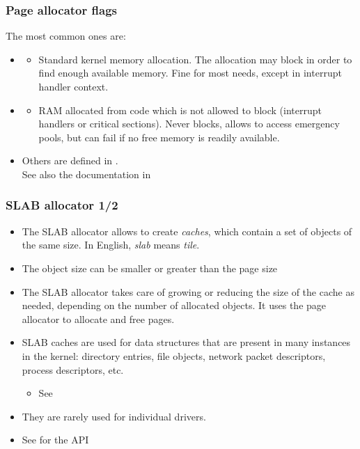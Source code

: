 \begin{frame}
  \frametitle{Page allocator flags}
  The most common ones are:
  \begin{itemize}
  \item {}
    \begin{itemize}
    \item Standard kernel memory allocation. The allocation may
      block in order to find enough available memory. Fine for most
      needs, except in interrupt handler context.
    \end{itemize}
  \item {}
    \begin{itemize}
    \item RAM allocated from code which is not allowed to block
      (interrupt handlers or critical sections). Never blocks,
      allows to access emergency pools, but can fail if no free
      memory is readily available.
    \end{itemize}
  \item Others are defined in .\\
      See also the documentation in 
  \end{itemize}
\end{frame}

\begin{frame}
  \frametitle{SLAB allocator 1/2}
  \begin{itemize}
  \item The SLAB allocator allows to create {\em caches}, which contain a
    set of objects of the same size. In English, {\em slab} means {\em tile}.
  \item The object size can be smaller or greater than the page size
  \item The SLAB allocator takes care of growing or reducing the size
    of the cache as needed, depending on the number of allocated
    objects. It uses the page allocator to allocate and free pages.
  \item SLAB caches are used for data structures that are present in
    many instances in the kernel: directory entries, file
    objects, network packet descriptors, process descriptors, etc.
    \begin{itemize}
    \item See 
    \end{itemize}
  \item They are rarely used for individual drivers.
  \item See  for the API
\end{itemize}
\end{frame}

